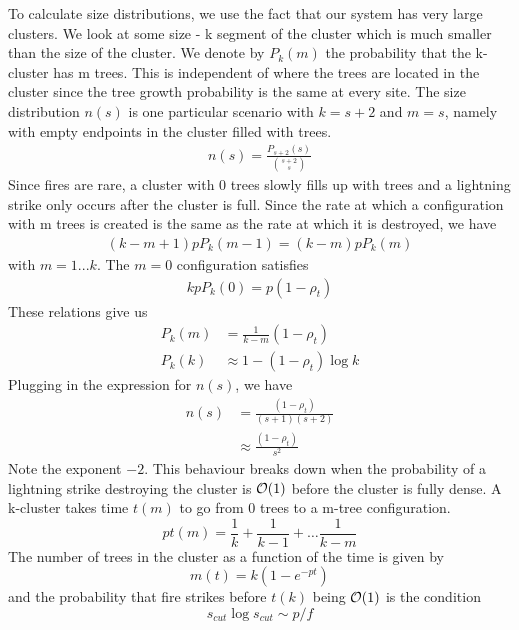\documentclass{article}
\numberwithin{equation}{section}
\newcommand{\cO}{{\cal O}}
\begin{document}
To calculate size distributions, we use the fact that our system has very large clusters. We look at some size - k segment of the cluster which is much smaller than the size of the cluster. We denote by $P_{k}(m)$ the probability that the k-cluster has m trees. This is independent of where the trees are located in the cluster since the tree growth probability is the same at every site. The size distribution $n(s)$ is one particular scenario with $k = s+2$ and $m = s$, namely with empty endpoints in the cluster filled with trees.
\begin{align}
    n(s) = \frac{P_{s+2}(s)}{{s+2 \choose s}}
\end{align}
Since fires are rare, a cluster with 0 trees slowly fills up with trees and a lightning strike only occurs after the cluster is full. Since the rate at which a configuration with m trees is created is the same as the rate at which it is destroyed, we have 
\begin{align}
(k - m + 1)p P_{k} (m-1) = (k-m) p P_k(m)
\end{align}
with $m = 1...k$. The $m = 0$ configuration satisfies 
\begin{align}
    k p P_{k}(0) = p(1-\rho_t)
\end{align}
These relations give us 
\begin{align}
    P_k(m) &= \frac{1}{k - m} (1 - \rho_t)  \\
    P_k(k) &\approx 1 - (1-\rho_t)\log k  
\end{align}
Plugging in the expression for $n(s)$, we have 
\begin{align}
    n(s) &= \frac{(1 - \rho_t)}{(s+1)(s+2)}   \\
    &\approx \frac{(1 - \rho_t)}{s^2} 
\end{align}
Note the exponent $-2$.
This behaviour breaks down when the probability of a lightning strike destroying the cluster is $\cO(1)$ before the cluster is fully dense. 
A k-cluster takes time $t(m)$ to go from 0 trees to a m-tree configuration. 
\begin{equation}
    p t(m) = \frac{1}{k} + \frac{1}{k-1} +\ldots  \frac{1}{k - m}
\end{equation}
The number of trees in the cluster as a function of the time is given by 
\begin{equation}
    m(t) = k (1 - e^{-pt})
\end{equation}
and the probability that fire strikes before $t(k)$  being $\cO(1)$ is the condition 
\begin{equation}
    s_{cut} \log{s_{cut}} \sim p/f
\end{equation}
\end{document}
